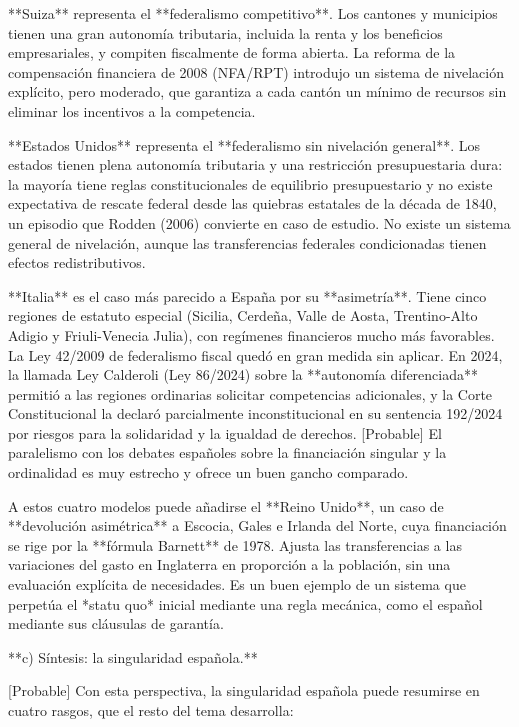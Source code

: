\documentclass[10pt,a4paper]{article}
\begin{document}
**Suiza** representa el **federalismo competitivo**. Los cantones y municipios tienen una gran autonomía tributaria, incluida la renta y los beneficios empresariales, y compiten fiscalmente de forma abierta. La reforma de la compensación financiera de 2008 (NFA/RPT) introdujo un sistema de nivelación explícito, pero moderado, que garantiza a cada cantón un mínimo de recursos sin eliminar los incentivos a la competencia.

**Estados Unidos** representa el **federalismo sin nivelación general**. Los estados tienen plena autonomía tributaria y una restricción presupuestaria dura: la mayoría tiene reglas constitucionales de equilibrio presupuestario y no existe expectativa de rescate federal desde las quiebras estatales de la década de 1840, un episodio que Rodden (2006) convierte en caso de estudio. No existe un sistema general de nivelación, aunque las transferencias federales condicionadas tienen efectos redistributivos.

**Italia** es el caso más parecido a España por su **asimetría**. Tiene cinco regiones de estatuto especial (Sicilia, Cerdeña, Valle de Aosta, Trentino-Alto Adigio y Friuli-Venecia Julia), con regímenes financieros mucho más favorables. La Ley 42/2009 de federalismo fiscal quedó en gran medida sin aplicar. En 2024, la llamada Ley Calderoli (Ley 86/2024) sobre la **autonomía diferenciada** permitió a las regiones ordinarias solicitar competencias adicionales, y la Corte Constitucional la declaró parcialmente inconstitucional en su sentencia 192/2024 por riesgos para la solidaridad y la igualdad de derechos. [Probable] El paralelismo con los debates españoles sobre la financiación singular y la ordinalidad es muy estrecho y ofrece un buen gancho comparado.

A estos cuatro modelos puede añadirse el **Reino Unido**, un caso de **devolución asimétrica** a Escocia, Gales e Irlanda del Norte, cuya financiación se rige por la **fórmula Barnett** de 1978. Ajusta las transferencias a las variaciones del gasto en Inglaterra en proporción a la población, sin una evaluación explícita de necesidades. Es un buen ejemplo de un sistema que perpetúa el *statu quo* inicial mediante una regla mecánica, como el español mediante sus cláusulas de garantía.

**c) Síntesis: la singularidad española.**

[Probable] Con esta perspectiva, la singularidad española puede resumirse en cuatro rasgos, que el resto del tema desarrolla:
\end{document}
